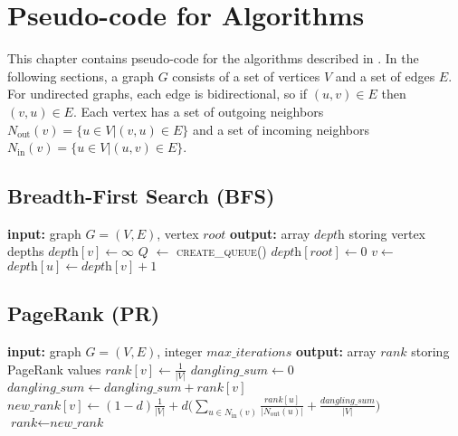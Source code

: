 \chapter{Pseudo-code for Algorithms}
\label{chap:algorithms}
This chapter contains pseudo-code for the algorithms described in . In the following sections, a graph $G$ consists of a set of vertices $V$ and a set of edges $E$. For undirected graphs, each edge is bidirectional, so if $(u, v) \in E$ then $(v, u) \in E$. Each vertex has a set of outgoing neighbors $N_\mathrm{out}(v) = \{u \in V | (v, u) \in E\}$ and a set of incoming neighbors $N_\mathrm{in}(v) = \{u \in V | (u, v) \in E\}$.

\section{Breadth-First Search (BFS)}

\begin{algorithm}[h!]
\begin{algorithmic}[1]
\Statex \textbf{input:} graph $G=(V,E)$, vertex $\textit{root}$
\Statex \textbf{output:} array $\textit{depth}$ storing vertex depths
  \State $\textit{depth}[v] \gets \infty$
\EndFor
\State $Q$ $\gets$  \textsc{create\_queue()}
\State {}
\State $\textit{depth}[\textit{root}] \gets 0$
  \State $v \gets $ 
      \State $\textit{depth}[u] \gets \textit{depth}[v] + 1$
      \State {}
    \EndIf
  \EndFor
\EndWhile
\end{algorithmic}
\end{algorithm}

\section{PageRank (PR)}

\begin{algorithm}[h!]
\begin{algorithmic}[1]
\Statex \textbf{input:} graph $G=(V,E)$, integer $\textit{max\_iterations}$
\Statex \textbf{output:} array $\textit{rank}$ storing PageRank values
  \State $\textit{rank}[v] \gets \frac{1}{|V|}$
\EndFor
{}
\State $\textit{dangling\_sum} \gets 0$
    \State $\textit{dangling\_sum} \gets \textit{dangling\_sum} + \textit{rank}[v]$
  \EndIf
\EndFor
{}
  \State $\textit{new\_rank}[v] \gets (1-d)\frac{1}{|V|} + d \Big( \sum_{u \in N_\mathrm{in}(v)} \frac{\textit{rank}[u]}{|N_\mathrm{out}(u)|} +  \frac{\textit{dangling\_sum}}{|V|} \Big)$
\EndFor
\State $\textit{rank} \gets \textit{new\_rank}$
\EndFor
\end{algorithmic}
\end{algorithm}

